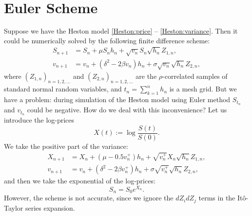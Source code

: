     \section{Euler Scheme}
        Suppose we have the Heston model \eqref{Heston:price} -- \eqref{Heston:variance}. Then it could be numerically solved by the following finite difference scheme:
        \begin{align}
            S_{n+1} & = S_n + \mu S_n h_n + \sqrt{v_n} S_n \sqrt{h_n} Z_{1,n}, \label{Euler:Heston:price}\\
            v_{n+1} & = v_n + \left(\delta^2 - 2\beta v_n\right) h_n + \sigma \sqrt{v_n} \sqrt{h_n} Z_{2,n}, \label{Euler:Heston:variance}
        \end{align}
        where $(Z_{1,n})_{n=1, 2, \dots}$ and $(Z_{2,n})_{n=1, 2, \dots}$ are the $\rho$-correlated samples of standard normal random variables, and $t_n = \sum_{k=1}^n h_n$ is a mesh grid.
        But we have a problem: during simulation of the Heston model using Euler method $S_{t_n}$ and $v_{t_n}$ could be negative. How do we deal with this inconvenience?
        Let us introduce the log-prices
        \begin{equation}
            X(t) := \log\frac{S(t)}{S(0)}.
        \end{equation}
        We take the positive part of the variance:
        \begin{align}
            X_{n+1} & = X_n + (\mu - 0.5 v_n^+)h_n + \sqrt{v_n^+} X_n \sqrt{h_n} Z_{1,n}, \label{Euler:Heston:price:posmod}\\
            v_{n+1} & = v_n + \left(\delta^2 - 2\beta v_n^+\right) h_n + \sigma \sqrt{v_n^+} \sqrt{h_n} Z_{2,n}, \label{Euler:Heston:variance:posmod}
        \end{align}
        and then we take the exponential of the log-prices:
        \begin{equation}
            S_{n} = S_0 e^{X_{n}}.
        \end{equation}
        However, the scheme is not accurate, since we ignore the $dZ_idZ_j$ terms in the It\^o-Taylor series expansion.

